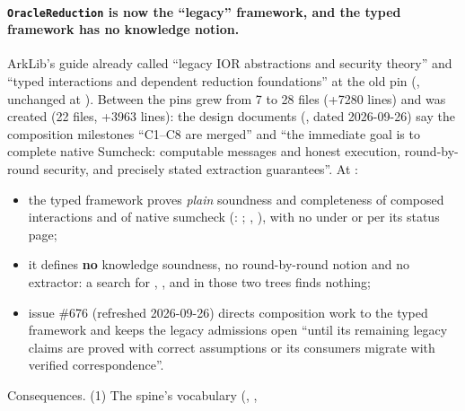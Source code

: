 \paragraph{\texorpdfstring{\texttt{OracleReduction}}{OracleReduction} is now the \enquote{legacy}
framework, and the typed framework has no knowledge notion.}\label{sec:gen-lib-ark-legacy}
ArkLib's guide already called \allowbreak{} \enquote{legacy IOR abstractions and
security theory} and \allowbreak{} \enquote{typed interactions and dependent
reduction foundations} at the old pin (, unchanged at ). Between
the pins \allowbreak{} grew from 7 to 28 files (+7280 lines) and
\allowbreak{}\allowbreak{}\allowbreak{} was created (22 files, +3963 lines): the design
documents (\allowbreak{}\allowbreak{}, dated 2026-09-26) say the composition milestones
\enquote{C1--C8 are merged} and \enquote{the immediate goal is to complete native Sumcheck:
computable messages and honest execution, round-by-round security, and precisely stated extraction
guarantees}. At :
\begin{itemize}
\item the typed framework proves \emph{plain} soundness and completeness of composed interactions
  and of native sumcheck (\allowbreak{}:
  ; \allowbreak{}\allowbreak{}
  , 
  \allowbreak{}), with no  under \allowbreak{} or
  \allowbreak{} per its status page;
\item it defines \textbf{no} knowledge soundness, no round-by-round notion and no extractor: a
  search for , ,  and 
  in those two trees finds nothing;
\item issue \#676 (refreshed 2026-09-26) directs composition work to the typed framework and keeps
  the legacy admissions open \enquote{until its remaining legacy claims are proved with correct
  assumptions or its consumers migrate with verified correspondence}.
\end{itemize}
Consequences. (1) The spine's vocabulary (, ,
